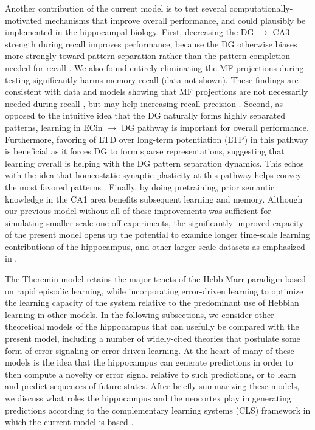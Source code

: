 \documentclass[11pt,twoside]{article}
\newif\myifpdf
\begin{document}
Another contribution of the current model is to test several computationally-motivated mechanisms that improve overall performance, and could plausibly be implemented in the hippocampal biology. First, decreasing the DG $\rightarrow$ CA3 strength during recall improves performance, because the DG otherwise biases more strongly toward pattern separation rather than the pattern completion needed for recall \citep{OReillyMcClelland94,KunecHasselmoKopell05}. We also found entirely eliminating the MF projections during testing significantly harms memory recall (data not shown).  These findings are consistent with data and models showing that MF projections are not necessarily needed during recall \citep{NakashibaCushmanPelkeyEtAl12,BernierLacagninaAyoubEtAl17,Rolls13}, but may help increasing recall precision \citep{RuedigerVittoriBednarekEtAl11,NakashibaCushmanPelkeyEtAl12,BernierLacagninaAyoubEtAl17,PignatelliRyanRoyEtAl19}.  Second, as opposed to the intuitive idea that the DG naturally forms highly separated patterns, learning in ECin $\rightarrow$ DG pathway is important for overall performance.  Furthermore, favoring of LTD over long-term potentiation (LTP) in this pathway is beneficial as it forces DG to form sparse representations, suggesting that learning overall is helping with the DG pattern separation dynamics.  This echos with the idea that homeostatic synaptic plasticity at this pathway helps convey the most favored patterns \citep{Hsu07}.  Finally, by doing pretraining, prior semantic knowledge in the CA1 area benefits subsequent learning and memory.  Although our previous model without all of these improvements was sufficient for simulating smaller-scale one-off experiments, the significantly improved capacity of the present model opens up the potential to examine longer time-scale learning contributions of the hippocampus, and other larger-scale datasets as emphasized in \citet{KowadloAhmedRawlinson20}.

The Theremin model retains the major tenets of the Hebb-Marr paradigm based on rapid episodic learning, while incorporating error-driven learning to optimize the learning capacity of the system relative to the predominant use of Hebbian learning in other models.  In the following subsections, we consider other theoretical models of the hippocampus that can usefully be compared with the present model, including a number of widely-cited theories that postulate some form of error-signaling or error-driven learning.  At the heart of many of these models is the idea that the hippocampus can generate predictions in order to then compute a novelty or error signal relative to such predictions, or to learn and predict sequences of future states. After briefly summarizing these models, we discuss what roles the hippocampus and the neocortex play in generating predictions according to the complementary learning systems (CLS) framework in which the current model is based \citep{McClellandMcNaughtonOReilly95,OReillyBhattacharyyaHowardEtAl14,OReillyRanganathRussin21}.  
\end{document}
